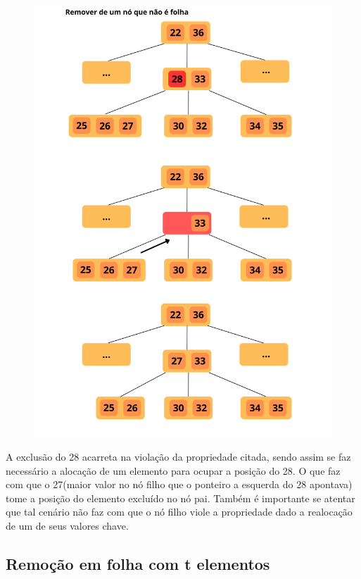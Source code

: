\begin{figure}[H]
	\centering
	\includegraphics[scale=0.2]{figures/remocao4.png}
\end{figure}

A exclusão do 28 acarreta na violação da propriedade citada, sendo assim se faz necessário a alocação de um elemento para ocupar a posição do 28. O que faz com que o 27(maior valor no nó filho que o ponteiro a esquerda do 28 apontava) tome a posição do elemento excluído no nó pai. Também é importante se atentar que tal cenário não faz com que o nó filho viole a propriedade dado a realocação de um de seus valores chave.

\subsection*{Remoção em folha com t elementos}

